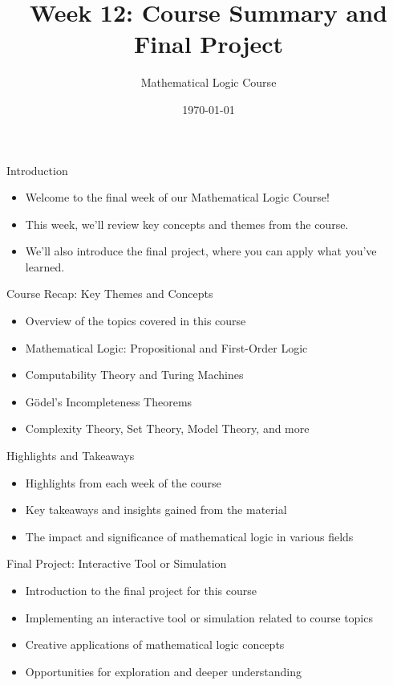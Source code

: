 \documentclass[presentation]{beamer}
\author{Mathematical Logic Course}
\date{\today}
\title{Week 12: Course Summary and Final Project}
\begin{document}
\maketitle

\begin{frame}[label={sec:org7d279fc}]{Introduction}
\begin{itemize}
\item Welcome to the final week of our Mathematical Logic Course!
\item This week, we'll review key concepts and themes from the course.
\item We'll also introduce the final project, where you can apply what you've learned.
\end{itemize}
\end{frame}

\begin{frame}[label={sec:org2963d55}]{Course Recap: Key Themes and Concepts}
\begin{itemize}
\item Overview of the topics covered in this course
\item Mathematical Logic: Propositional and First-Order Logic
\item Computability Theory and Turing Machines
\item Gödel's Incompleteness Theorems
\item Complexity Theory, Set Theory, Model Theory, and more
\end{itemize}
\end{frame}

\begin{frame}[label={sec:org5373c5c}]{Highlights and Takeaways}
\begin{itemize}
\item Highlights from each week of the course
\item Key takeaways and insights gained from the material
\item The impact and significance of mathematical logic in various fields
\end{itemize}
\end{frame}

\begin{frame}[label={sec:org960a48a}]{Final Project: Interactive Tool or Simulation}
\begin{itemize}
\item Introduction to the final project for this course
\item Implementing an interactive tool or simulation related to course topics
\item Creative applications of mathematical logic concepts
\item Opportunities for exploration and deeper understanding
\end{itemize}
\end{frame}
\end{document}
